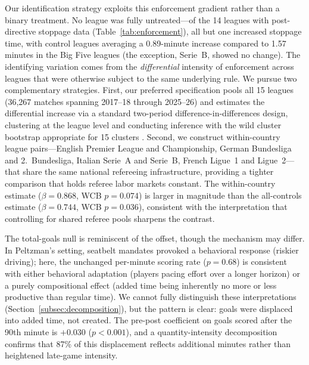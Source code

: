 \documentclass[12pt]{article}
\begin{document}
Our identification strategy exploits this enforcement gradient rather than a binary treatment. No league was fully untreated---of the 14 leagues with post-directive stoppage data (Table~\ref{tab:enforcement}), all but one increased stoppage time, with control leagues averaging a 0.89-minute increase compared to 1.57 minutes in the Big Five leagues (the exception, Serie~B, showed no change). The identifying variation comes from the \emph{differential} intensity of enforcement across leagues that were otherwise subject to the same underlying rule. We pursue two complementary strategies. First, our preferred specification pools all 15 leagues (36,267 matches spanning 2017--18 through 2025--26) and estimates the differential increase via a standard two-period difference-in-differences design, clustering at the league level and conducting inference with the wild cluster bootstrap appropriate for 15 clusters \citep{cameron2008bootstrap}. Second, we construct within-country league pairs---English Premier League and Championship, German Bundesliga and 2.~Bundesliga, Italian Serie~A and Serie~B, French Ligue~1 and Ligue~2---that share the same national refereeing infrastructure, providing a tighter comparison that holds referee labor markets constant. The within-country estimate ($\beta = 0.868$, WCB $p = 0.074$) is larger in magnitude than the all-controls estimate ($\beta = 0.744$, WCB $p = 0.036$), consistent with the interpretation that controlling for shared referee pools sharpens the contrast.

The total-goals null is reminiscent of the \citet{peltzman1975effects} offset, though the mechanism may differ. In Peltzman's setting, seatbelt mandates provoked a behavioral response (riskier driving); here, the unchanged per-minute scoring rate ($p = 0.68$) is consistent with either behavioral adaptation (players pacing effort over a longer horizon) or a purely compositional effect (added time being inherently no more or less productive than regular time). We cannot fully distinguish these interpretations (Section~\ref{subsec:decomposition}), but the pattern is clear: goals were displaced into added time, not created. The pre-post coefficient on goals scored after the 90th minute is $+0.030$ ($p<0.001$), and a quantity-intensity decomposition confirms that 87\% of this displacement reflects additional minutes rather than heightened late-game intensity.
\end{document}
